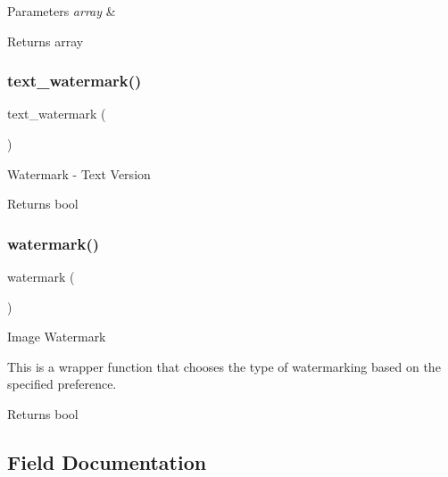 \begin{DoxyParams}{Parameters}
{\em array} & \\
\hline
\end{DoxyParams}
\begin{DoxyReturn}{Returns}
array 
\end{DoxyReturn}
\mbox{\label{class_c_i___image__lib_afb7640b6150e16b00efac0511d9fa03d}} 
\subsubsection{\texorpdfstring{text\+\_\+watermark()}{text\_watermark()}}
{\footnotesize\ttfamily text\+\_\+watermark (\begin{DoxyParamCaption}{ }\end{DoxyParamCaption})}

Watermark -\/ Text Version

\begin{DoxyReturn}{Returns}
bool 
\end{DoxyReturn}
\mbox{\label{class_c_i___image__lib_a4732a76680e7c0b28f98f6634b567cc9}} 
\subsubsection{\texorpdfstring{watermark()}{watermark()}}
{\footnotesize\ttfamily watermark (\begin{DoxyParamCaption}{ }\end{DoxyParamCaption})}

Image Watermark

This is a wrapper function that chooses the type of watermarking based on the specified preference.

\begin{DoxyReturn}{Returns}
bool 
\end{DoxyReturn}


\subsection{Field Documentation}
\mbox{\label{class_c_i___image__lib_a4c7eeae509bbd8ac493cafa8a5b9980e}} 
